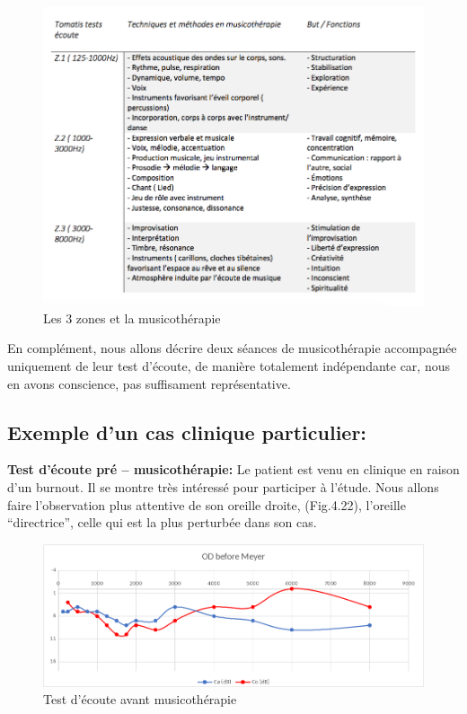 \begin{figure}[tbh]
	\centering
	\includegraphics[width=1\linewidth]{images/testtechnmethbut}
	\caption[Zones du test avec la musicothérapie]{Les 3
          zones et la musicothérapie}

	\label{testbutetfonction}
\end{figure}



En complément, nous allons décrire deux séances de
musicothérapie accompagnée uniquement de leur test d'écoute, de
manière totalement indépendante car, nous en avons conscience, pas
suffisament représentative.

\subsection{Exemple d'un cas clinique particulier:}

\textbf{ Test d'écoute pré -- musicothérapie:}
 	Le patient est venu en clinique en raison d'un burnout. Il se montre très
        intéressé pour participer à l'étude. Nous allons faire
        l'observation plus attentive de
        son oreille droite, (Fig.4.22), l'oreille ``directrice'',
        celle qui est la plus perturbée dans son cas.


 	\begin{figure}[tbh]
 		\centering
 		\includegraphics[width=0.7\linewidth]{images/clinique/od_before_meyer.png}
 		\caption{Test d'écoute avant musicothérapie}
 		\label{fig:odbeforemeyer}
 	\end{figure}



